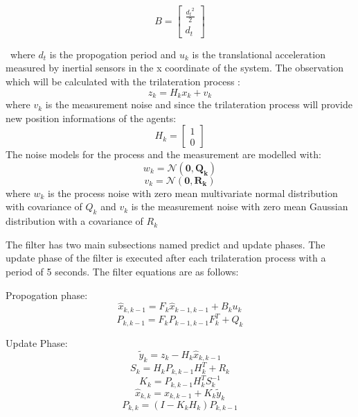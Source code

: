 \documentclass[twoside]{article}
\begin{document}
	\begin{equation}
B = \begin{bmatrix}
\frac{{d_t}^2}{2} \\
d_t
\end{bmatrix}
	\end{equation}
	
	\
	where $d_t$ is the propogation period and $u_k$ is the translational acceleration measured by inertial sensors in the x coordinate of the system. The observation which will be calculated with the trilateration process :
	\begin{equation}
z_k = H_kx_k + v_k
	\end{equation}
	where $v_k$ is the measurement noise and since the trilateration process will provide new position informations of the agents:
	\begin{equation}
H_k = \begin{bmatrix}
1\\0
\end{bmatrix}
	\end{equation}
	The noise models for the process and the measurement are modelled with:
	\begin{equation}
 w_k = \mathcal{N}(\mathbf{0,Q_k})
	\end{equation}
		\begin{equation}
		v_k = \mathcal{N}(\mathbf{0,R_k})
		\end{equation}
		where $w_k$ is the process noise with zero mean multivariate normal distribution with covariance of $Q_k$ and $v_k$ is the measurement noise with zero mean Gaussian distribution with a covariance of $R_k$
		
		The filter has two main subsections named predict and update phases. The update phase of the filter is executed after each trilateration process with a period of 5 seconds. The filter equations are as follows:
		
		Propogation phase:
		\begin{equation}
    \hat{x}_{k,k-1} = F_k\hat{x}_{k-1,k-1} + B_ku_k
		\end{equation}
		\begin{equation}
 P_{k,k-1} = F_k P_{k-1,k-1}F^T_k + Q_k
		\end{equation}
		
		Update Phase:
		\begin{equation}
\tilde{y}_k = z_k - H_k  \hat{x}_{k,k-1} 
\end{equation}
	\begin{equation}
S_k = H_k P_{k,k-1} H^T_k + R_k
\end{equation}
	\begin{equation}
K_k =  P_{k,k-1} H^T_kS_k^{-1}
		\end{equation}
		\begin{equation}
 \hat{x}_{k,k} =  \hat{x}_{k,k-1} + K_k \tilde{y}_k
		\end{equation}
		\begin{equation}
P_{k,k} = (I - K_kH_k)P_{k,k-1}
		\end{equation}
		
\end{document}
